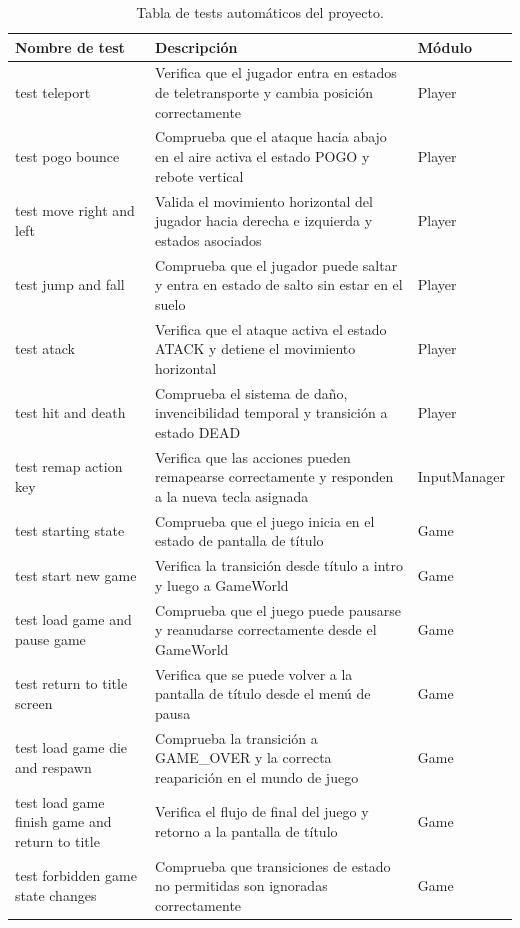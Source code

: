 \begin{table}[!ht]
    \centering
    \begin{tabular}{|p{4cm}|p{6cm}|p{2cm}|}
    \hline
        Nombre de test & Descripción & Módulo \\ \hline
        test teleport & Verifica que el jugador entra en estados de teletransporte y cambia posición correctamente & Player \\ \hline
        test pogo bounce & Comprueba que el ataque hacia abajo en el aire activa el estado POGO y rebote vertical & Player \\ \hline
        test move right and left & Valida el movimiento horizontal del jugador hacia derecha e izquierda y estados asociados & Player \\ \hline
        test jump and fall & Comprueba que el jugador puede saltar y entra en estado de salto sin estar en el suelo & Player \\ \hline
        test atack & Verifica que el ataque activa el estado ATACK y detiene el movimiento horizontal & Player \\ \hline
        test hit and death & Comprueba el sistema de daño, invencibilidad temporal y transición a estado DEAD & Player \\ \hline
        test remap action key & Verifica que las acciones pueden remapearse correctamente y responden a la nueva tecla asignada & InputManager \\ \hline
        test starting state & Comprueba que el juego inicia en el estado de pantalla de título & Game \\ \hline
        test start new game & Verifica la transición desde título a intro y luego a GameWorld & Game \\ \hline
        test load game and pause game & Comprueba que el juego puede pausarse y reanudarse correctamente desde el GameWorld & Game \\ \hline
        test return to title screen & Verifica que se puede volver a la pantalla de título desde el menú de pausa & Game \\ \hline
        test load game die and respawn & Comprueba la transición a GAME\_OVER y la correcta reaparición en el mundo de juego & Game \\ \hline
        test load game finish game and return to title & Verifica el flujo de final del juego y retorno a la pantalla de título & Game \\ \hline
        test forbidden game state changes & Comprueba que transiciones de estado no permitidas son ignoradas correctamente & Game \\ \hline
    \end{tabular}
    \caption{Tabla de tests automáticos del proyecto.}
    \label{tab:test-table}
\end{table}

